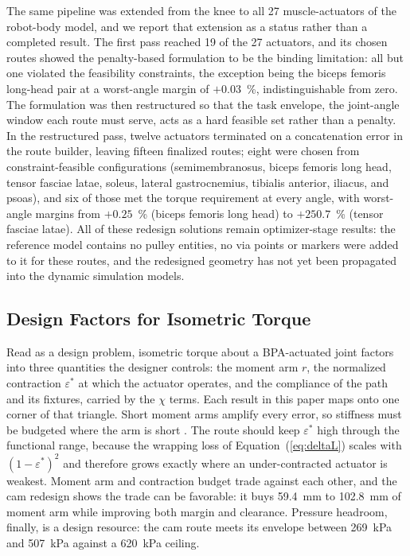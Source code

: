 The same pipeline was extended from the knee to all 27 muscle-actuators of the robot-body model, and we report that extension as a status rather than a completed result. The first pass reached 19 of the 27 actuators, and its chosen routes showed the penalty-based formulation to be the binding limitation: all but one violated the feasibility constraints, the exception being the biceps femoris long-head pair at a worst-angle margin of $+0.03$~\%, indistinguishable from zero. The formulation was then restructured so that the task envelope, the joint-angle window each route must serve, acts as a hard feasible set rather than a penalty. In the restructured pass, twelve actuators terminated on a concatenation error in the route builder, leaving fifteen finalized routes; eight were chosen from constraint-feasible configurations (semimembranosus, biceps femoris long head, tensor fasciae latae, soleus, lateral gastrocnemius, tibialis anterior, iliacus, and psoas), and six of those met the torque requirement at every angle, with worst-angle margins from $+0.25$~\% (biceps femoris long head) to $+250.7$~\% (tensor fasciae latae). All of these redesign solutions remain optimizer-stage results: the reference model contains no pulley entities, no via points or markers were added to it for these routes, and the redesigned geometry has not yet been propagated into the dynamic simulation models.

\subsection{Design Factors for Isometric Torque}\label{sec:design_factors}

Read as a design problem, isometric torque about a BPA-actuated joint factors into three quantities the designer controls: the moment arm $r$, the normalized contraction $\varepsilon^{*}$ at which the actuator operates, and the compliance of the path and its fixtures, carried by the $\chi$ terms. Each result in this paper maps onto one corner of that triangle. Short moment arms amplify every error, so stiffness must be budgeted where the arm is short \citep{young_analyzing_2019}. The route should keep $\varepsilon^{*}$ high through the functional range, because the wrapping loss of Equation~(\ref{eq:deltaL}) scales with $(1 - \varepsilon^{*})^{2}$ and therefore grows exactly where an under-contracted actuator is weakest. Moment arm and contraction budget trade against each other, and the cam redesign shows the trade can be favorable: it buys \qty{59.4}{\mm} to \qty{102.8}{\mm} of moment arm while improving both margin and clearance. Pressure headroom, finally, is a design resource: the cam route meets its envelope between \qty{269}{\kPa} and \qty{507}{\kPa} against a \qty{620}{\kPa} ceiling.

